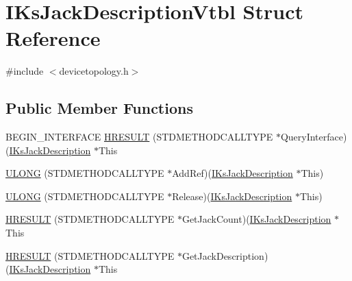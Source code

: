 \hypertarget{struct_i_ks_jack_description_vtbl}{}\section{I\+Ks\+Jack\+Description\+Vtbl Struct Reference}
\label{struct_i_ks_jack_description_vtbl}


{\ttfamily \#include $<$devicetopology.\+h$>$}

\subsection*{Public Member Functions}
\begin{DoxyCompactItemize}
\item 
B\+E\+G\+I\+N\+\_\+\+I\+N\+T\+E\+R\+F\+A\+CE \hyperlink{struct_i_ks_jack_description_vtbl_a373ee4e6cddf2fa0c756fa462a597afa}{H\+R\+E\+S\+U\+LT} (S\+T\+D\+M\+E\+T\+H\+O\+D\+C\+A\+L\+L\+T\+Y\+PE $\ast$Query\+Interface)(\hyperlink{devicetopology_8h_a309e1781c2a5279a8dcd39a197a59003}{I\+Ks\+Jack\+Description} $\ast$This
\item 
\hyperlink{struct_i_ks_jack_description_vtbl_ae24cdd52a0675f418c6f8cf16c155690}{U\+L\+O\+NG} (S\+T\+D\+M\+E\+T\+H\+O\+D\+C\+A\+L\+L\+T\+Y\+PE $\ast$Add\+Ref)(\hyperlink{devicetopology_8h_a309e1781c2a5279a8dcd39a197a59003}{I\+Ks\+Jack\+Description} $\ast$This)
\item 
\hyperlink{struct_i_ks_jack_description_vtbl_aba5cf8d512c2c68a1fe09fa2278c9cc8}{U\+L\+O\+NG} (S\+T\+D\+M\+E\+T\+H\+O\+D\+C\+A\+L\+L\+T\+Y\+PE $\ast$Release)(\hyperlink{devicetopology_8h_a309e1781c2a5279a8dcd39a197a59003}{I\+Ks\+Jack\+Description} $\ast$This)
\item 
\hyperlink{struct_i_ks_jack_description_vtbl_acb505db95f169b4537b0b9bbe32c7b76}{H\+R\+E\+S\+U\+LT} (S\+T\+D\+M\+E\+T\+H\+O\+D\+C\+A\+L\+L\+T\+Y\+PE $\ast$Get\+Jack\+Count)(\hyperlink{devicetopology_8h_a309e1781c2a5279a8dcd39a197a59003}{I\+Ks\+Jack\+Description} $\ast$This
\item 
\hyperlink{struct_i_ks_jack_description_vtbl_acac2e5cddef6f0ee2f98ef17c75fbf78}{H\+R\+E\+S\+U\+LT} (S\+T\+D\+M\+E\+T\+H\+O\+D\+C\+A\+L\+L\+T\+Y\+PE $\ast$Get\+Jack\+Description)(\hyperlink{devicetopology_8h_a309e1781c2a5279a8dcd39a197a59003}{I\+Ks\+Jack\+Description} $\ast$This
\end{DoxyCompactItemize}
